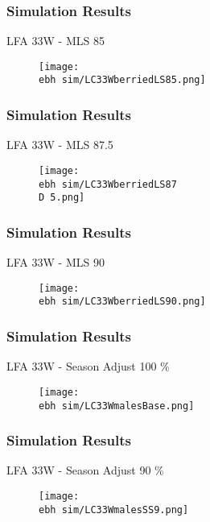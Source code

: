 \documentclass{beamer}
\newcommand{\ebh}{\string~/bio.data/bio.lobster/figures/LFA2733Framework2018/} %
\newcommand{\D}{.}
\begin{document}
\begin{frame}
\frametitle{Simulation Results}
LFA 33W - MLS 85
\begin{figure}
        \begin{center}
            \texttt{[image: \\ebh sim/LC33WberriedLS85.png]}
        \end{center}
    \end{figure}
\end{frame}


\begin{frame}
\frametitle{Simulation Results}
LFA 33W - MLS 87.5
\begin{figure}
        \begin{center}
            \texttt{[image: \\ebh sim/LC33WberriedLS87\\D 5.png]}
        \end{center}
    \end{figure}
\end{frame}


\begin{frame}
\frametitle{Simulation Results}
LFA 33W - MLS 90
\begin{figure}
        \begin{center}
            \texttt{[image: \\ebh sim/LC33WberriedLS90.png]}
        \end{center}
    \end{figure}
\end{frame}





\begin{frame}
\frametitle{Simulation Results}
LFA 33W - Season Adjust 100 \%
\begin{figure}
        \begin{center}
            \texttt{[image: \\ebh sim/LC33WmalesBase.png]}
        \end{center}
    \end{figure}
\end{frame}


\begin{frame}
\frametitle{Simulation Results}
LFA 33W - Season Adjust 90 \%
\begin{figure}
        \begin{center}
            \texttt{[image: \\ebh sim/LC33WmalesSS9.png]}
        \end{center}
    \end{figure}
\end{frame}
\end{document}
